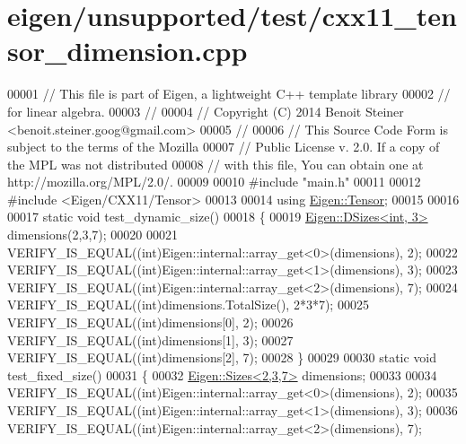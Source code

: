 \hypertarget{eigen_2unsupported_2test_2cxx11__tensor__dimension_8cpp_source}{}\section{eigen/unsupported/test/cxx11\+\_\+tensor\+\_\+dimension.cpp}
\label{eigen_2unsupported_2test_2cxx11__tensor__dimension_8cpp_source}

\begin{DoxyCode}
00001 \textcolor{comment}{// This file is part of Eigen, a lightweight C++ template library}
00002 \textcolor{comment}{// for linear algebra.}
00003 \textcolor{comment}{//}
00004 \textcolor{comment}{// Copyright (C) 2014 Benoit Steiner <benoit.steiner.goog@gmail.com>}
00005 \textcolor{comment}{//}
00006 \textcolor{comment}{// This Source Code Form is subject to the terms of the Mozilla}
00007 \textcolor{comment}{// Public License v. 2.0. If a copy of the MPL was not distributed}
00008 \textcolor{comment}{// with this file, You can obtain one at http://mozilla.org/MPL/2.0/.}
00009 
00010 \textcolor{preprocessor}{#include "main.h"}
00011 
00012 \textcolor{preprocessor}{#include <Eigen/CXX11/Tensor>}
00013 
00014 \textcolor{keyword}{using} \hyperlink{class_eigen_1_1_tensor}{Eigen::Tensor};
00015 
00016 
00017 \textcolor{keyword}{static} \textcolor{keywordtype}{void} test\_dynamic\_size()
00018 \{
00019   \hyperlink{struct_eigen_1_1_d_sizes}{Eigen::DSizes<int, 3>} dimensions(2,3,7);
00020 
00021   VERIFY\_IS\_EQUAL((\textcolor{keywordtype}{int})Eigen::internal::array\_get<0>(dimensions), 2);
00022   VERIFY\_IS\_EQUAL((\textcolor{keywordtype}{int})Eigen::internal::array\_get<1>(dimensions), 3);
00023   VERIFY\_IS\_EQUAL((\textcolor{keywordtype}{int})Eigen::internal::array\_get<2>(dimensions), 7);
00024   VERIFY\_IS\_EQUAL((\textcolor{keywordtype}{int})dimensions.TotalSize(), 2*3*7);
00025   VERIFY\_IS\_EQUAL((\textcolor{keywordtype}{int})dimensions[0], 2);
00026   VERIFY\_IS\_EQUAL((\textcolor{keywordtype}{int})dimensions[1], 3);
00027   VERIFY\_IS\_EQUAL((\textcolor{keywordtype}{int})dimensions[2], 7);
00028 \}
00029 
00030 \textcolor{keyword}{static} \textcolor{keywordtype}{void} test\_fixed\_size()
00031 \{
00032   \hyperlink{struct_eigen_1_1_sizes}{Eigen::Sizes<2,3,7>} dimensions;
00033 
00034   VERIFY\_IS\_EQUAL((\textcolor{keywordtype}{int})Eigen::internal::array\_get<0>(dimensions), 2);
00035   VERIFY\_IS\_EQUAL((\textcolor{keywordtype}{int})Eigen::internal::array\_get<1>(dimensions), 3);
00036   VERIFY\_IS\_EQUAL((\textcolor{keywordtype}{int})Eigen::internal::array\_get<2>(dimensions), 7);

\end{DoxyCode}
